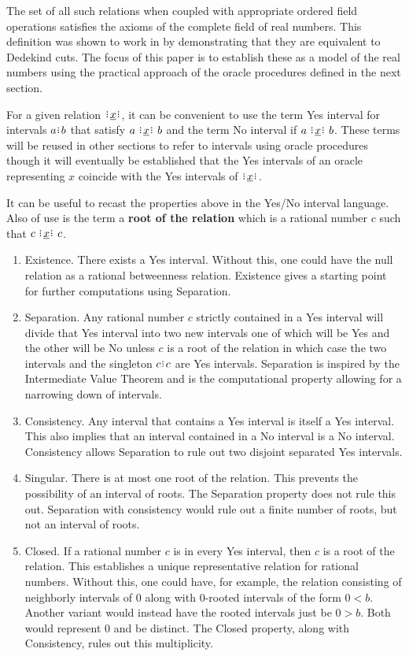 \documentclass[12pt]{article}
\begin{document}
The set of all such relations when coupled with appropriate ordered field operations satisfies the axioms of the complete field of real numbers. This definition was shown to work in \cite{taylor24dedekind} by demonstrating that they are equivalent to Dedekind cuts. The focus of this paper is to establish these as a model of the real numbers using the practical approach of the oracle procedures defined in the next section. 

For a given relation $\xrel$, it can be convenient to use the term Yes interval for intervals $a\rint b$ that satisfy $a \xrel b$ and the term No interval if \sout{$ a \xrel b$}. These terms will be reused in other sections to refer to intervals using oracle procedures though it will eventually be established that the Yes intervals of an oracle representing $x$ coincide with the Yes intervals of $\xrel$.

It can be useful to recast the properties above in the Yes/No interval language. Also of use is the term a \textbf{root of the relation} which is a rational number $c$ such that $c \xrel c$.

\begin{enumerate}
    \item Existence. There exists a Yes interval. Without this, one could have the null relation as a rational betweenness relation. Existence gives a starting point for further computations using Separation. 
    \item Separation. Any rational number $c$ strictly contained in a Yes interval will divide that Yes interval into two new intervals one of which will be Yes and the other will be No unless $c$ is a root of the relation in which case the two intervals and the singleton $c\rint c$ are Yes intervals. Separation is inspired by the Intermediate Value Theorem and is the computational property allowing for a narrowing down of intervals. 
    \item Consistency. Any interval that contains a Yes interval is itself a Yes interval. This also implies that an interval contained in a No interval is a No interval. Consistency allows Separation to rule out two disjoint separated Yes intervals. 
    \item Singular. There is at most one root of the relation. This prevents the possibility of an interval of roots. The Separation property does not rule this out. Separation with consistency would rule out a finite number of roots, but not an interval of roots.  
    \item Closed. If a rational number $c$ is in every Yes interval, then $c$ is a root of the relation. This establishes a unique representative relation for rational numbers. Without this, one could have, for example, the relation consisting of neighborly intervals of $0$ along with $0$-rooted intervals of the form $0 \lt b$. Another variant would instead have the rooted intervals just be $0 \gt b$. Both would represent $0$ and be distinct. The Closed property, along with Consistency, rules out this multiplicity. 
\end{enumerate}
\end{document}
